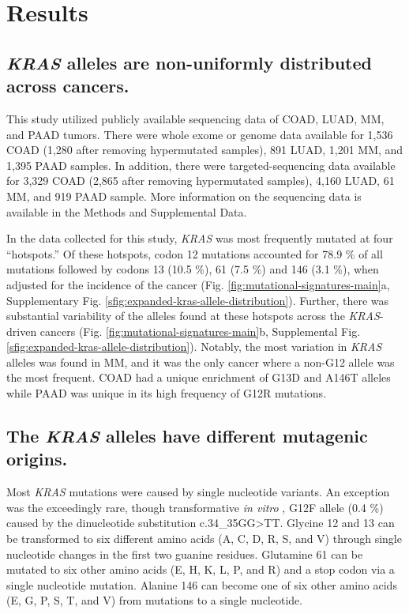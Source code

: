 \documentclass[english, 10pt, letterpaper]{article}
\newcommand{\KRAS}{\emph{KRAS}}
\begin{document}
\section*{Results}

\subsection*{\KRAS{} alleles are non-uniformly distributed across cancers.}

This study utilized publicly available sequencing data of COAD, LUAD, MM, and PAAD tumors.
There were whole exome or genome data available for 1,536 COAD (1,280 after removing hypermutated samples), 891 LUAD, 1,201 MM, and 1,395 PAAD samples.
In addition, there were targeted-sequencing data available for 3,329 COAD (2,865 after removing hypermutated samples), 4,160 LUAD, 61 MM, and 919 PAAD sample.
More information on the sequencing data is available in the Methods and Supplemental Data.

In the data collected for this study, \KRAS{} was most frequently mutated at four “hotspots.” 
Of these hotspots, codon 12 mutations accounted for 78.9 \% of all mutations followed by codons 13 (10.5 \%), 61 (7.5 \%) and 146 (3.1 \%), when adjusted for the incidence of the cancer (Fig. \ref{fig:mutational-signatures-main}a, Supplementary Fig. \ref{sfig:expanded-kras-allele-distribution}).
Further, there was substantial variability of the alleles found at these hotspots across the \KRAS{}-driven cancers (Fig. \ref{fig:mutational-signatures-main}b, Supplemental Fig. \ref{sfig:expanded-kras-allele-distribution}). 
Notably, the most variation in \KRAS{} alleles was found in MM, and it was the only cancer where a non-G12 allele was the most frequent. 
COAD had a unique enrichment of G13D and A146T alleles while PAAD was unique in its high frequency of G12R mutations.


\subsection*{The \KRAS{} alleles have different mutagenic origins.}

Most \KRAS{} mutations were caused by single nucleotide variants.
An exception was the exceedingly rare, though transformative \emph{in vitro} \cite{Barbacid1987}, G12F allele (0.4 \%) caused by the dinucleotide substitution c.34\_35GG>TT.
Glycine 12 and 13 can be transformed to six different amino acids (A, C, D, R, S, and V) through single nucleotide changes in the first two guanine residues.
Glutamine 61 can be mutated to six other amino acids (E, H, K, L, P, and R) and a stop codon via a single nucleotide mutation.
Alanine 146 can become one of six other amino acids (E, G, P, S, T, and V) from mutations to a single nucleotide.
\end{document}
